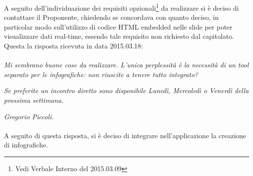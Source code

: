 A seguito dell'individuazione dei requisiti opzionali\footnote{Vedi \gls{Verbale} Interno del 2015.03.09} da realizzare si è deciso di contattare il Proponente, chiedendo se concordava con quanto deciso, in particolar modo sull'utilizzo di codice \gls{HTML} embedded nelle slide per poter visualizzare dati real-time, essendo tale requisito non richiesto dal capitolato. Questa la risposta ricevuta in data 2015.03.18:

\paragraph{}
\textit{Mi sembrano buone cose da realizzare. L'unica perplessità è la necessità di un tool separato per le infografiche: non riuscite a tenere tutto integrato?} 
	
\noindent \textit{Se preferite un incontro diretto sono disponibile Lunedì, Mercoledì o Venerdì della prossima settimana.}

\noindent \textit{Gregorio Piccoli.}

\paragraph{}
\noindent A seguito di questa risposta, si è deciso di integrare nell'applicazione la creazione di infografiche.

